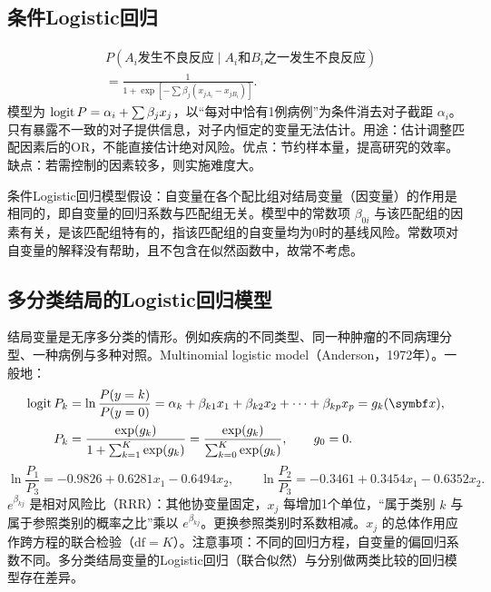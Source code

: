 \subsection{条件Logistic回归}
\begin{align*}
&P(A_i\text{发生不良反应}\mid A_i\text{和}B_i\text{之一发生不良反应})\\
&=\frac1{1+\exp[-\sum\beta_j(x_{jA_i}-x_{jB_i})]}.
\end{align*}
模型为 $\operatorname{logit} P=\alpha_i+\sum\beta_jx_j$，以“每对中恰有1例病例”为条件消去对子截距 $\alpha_i$。只有暴露不一致的对子提供信息，对子内恒定的变量无法估计。用途：估计调整匹配因素后的OR，不能直接估计绝对风险。优点：节约样本量，提高研究的效率。缺点：若需控制的因素较多，则实施难度大。

条件Logistic回归模型假设：自变量在各个配比组对结局变量（因变量）的作用是相同的，即自变量的回归系数与匹配组无关。模型中的常数项 $\beta_{0i}$ 与该匹配组的因素有关，是该匹配组特有的，指该匹配组的自变量均为0时的基线风险。常数项对自变量的解释没有帮助，且不包含在似然函数中，故常不考虑。
\subsection{多分类结局的Logistic回归模型}
结局变量是无序多分类的情形。例如疾病的不同类型、同一种肿瘤的不同病理分型、一种病例与多种对照。Multinomial logistic model（Anderson，1972年）。一般地：
\begin{align*}
\logit P_k&=\ln\frac{P(y=k)}{P(y=0)}
 =\alpha_k+\beta_{k1}x_1+\beta_{k2}x_2+\cdots+\beta_{kp}x_p=g_k(\bm x),\\
P_k&=\frac{\exp(g_k)}{1+\sum_{k=1}^K\exp(g_k)}
 =\frac{\exp(g_k)}{\sum_{k=0}^K\exp(g_k)},\qquad g_0=0.
\end{align*}
\[
\ln\frac{P_1}{P_3}=-0.9826+0.6281x_1-0.6494x_2,\qquad
\ln\frac{P_2}{P_3}=-0.3461+0.3454x_1-0.6352x_2.
\]
$e^{\beta_{kj}}$ 是相对风险比（RRR）：其他协变量固定，$x_j$ 每增加1个单位，“属于类别 $k$ 与属于参照类别的概率之比”乘以 $e^{\beta_{kj}}$。更换参照类别时系数相减。$x_j$ 的总体作用应作跨方程的联合检验（$\mathrm{df}=K$）。注意事项：不同的回归方程，自变量的偏回归系数不同。多分类结局变量的Logistic回归（联合似然）与分别做两类比较的回归模型存在差异。
